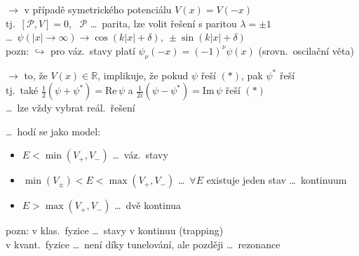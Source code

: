 \begin{center}
\end{center}

$\to$ v případě symetrického potenciálu $V(x) = V(-x)$ \\
\quad tj.\ $[\mathcal{P},V] = 0$, \ $\mathcal{P}$ \dots\ parita, lze volit řešení s paritou $\lambda = \pm1$ \\
\hspace*{5cm} \dots\ $\psi(|x|\to\infty)\to\cos(k|x| + \delta), \ \pm\sin(k|x| + \delta)$ \\
pozn: $\hookrightarrow$ pro váz.\ stavy platí $\psi_\nu(-x) = (-1)^\nu\psi(x)$ \quad (srovn.\ oscilační věta)

$\to$ to, že $V(x)\in\mathbb{R}$, implikuje, že pokud $\psi$ řeší $(*)$, pak $\psi^*$ řeší \\
\quad tj.\ také $\frac12(\psi + \psi^*) = \mathrm{Re}\,\psi$ a $\frac{1}{2i}(\psi - \psi^*) = \mathrm{Im}\,\psi$ řeší $(*)$ \\
\quad \dots\ lze vždy vybrat reál.\ řešení \quad {}

 \dots\ hodí se jako model:
\begin{itemize}[nosep]
  \item[] $E < \min(V_+,V_-)$ \dots\ váz.\ stavy
  \item[] $\min(V_\pm) < E < \max(V_+,V_-)$ \dots\ $\forall E$ existuje jeden stav \dots\ kontinuum
  \item[] $E > \max(V_+,V_-)$ \dots\ dvě kontinua
\end{itemize}
pozn: v klas.\ fyzice \dots\ stavy v kontinuu (trapping) \\
\phantom{pozn:} v kvant.\ fyzice \dots\ není díky tunelování, ale později \dots\ rezonance


